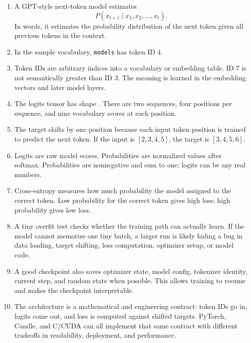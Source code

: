 \begin{enumerate}
  \item A GPT-style next-token model estimates
  \[
  P(x_{t+1} \mid x_1, x_2, \ldots, x_t).
  \]
  In words, it estimates the probability distribution of the next token given all previous tokens in the context.

  \item In the sample vocabulary, \texttt{models} has token ID \(4\).

  \item Token IDs are arbitrary indices into a vocabulary or embedding table. ID \(7\) is not semantically greater than ID \(3\). The meaning is learned in the embedding vectors and later model layers.

  \item The logits tensor has shape \shape{[2, 4, 9]}. There are two sequences, four positions per sequence, and nine vocabulary scores at each position.

  \item The target shifts by one position because each input token position is trained to predict the next token. If the input is \([2,3,4,5]\), the target is \([3,4,5,6]\).

  \item Logits are raw model scores. Probabilities are normalized values after softmax. Probabilities are nonnegative and sum to one; logits can be any real numbers.

  \item Cross-entropy measures how much probability the model assigned to the correct token. Low probability for the correct token gives high loss; high probability gives low loss.

  \item A tiny overfit test checks whether the training path can actually learn. If the model cannot memorize one tiny batch, a larger run is likely hiding a bug in data loading, target shifting, loss computation, optimizer setup, or model code.

  \item A good checkpoint also saves optimizer state, model config, tokenizer identity, current step, and random state when possible. This allows training to resume and makes the checkpoint interpretable.

  \item The architecture is a mathematical and engineering contract: token IDs go in, logits come out, and loss is computed against shifted targets. PyTorch, Candle, and C/CUDA can all implement that same contract with different tradeoffs in readability, deployment, and performance.
\end{enumerate}

